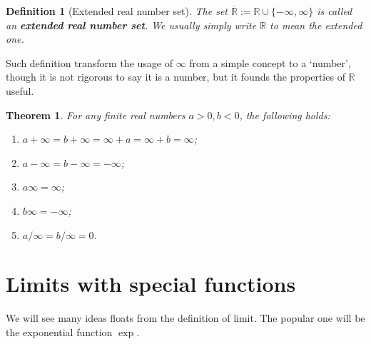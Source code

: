 \documentclass[12pt]{article}
\newtheorem{definition}{Definition}[section]
\newtheorem*{theorem}{Theorem}
\begin{document}
    \begin{definition}[Extended real number set]
        The set $\overline{\mathbb{R}}:=\mathbb{R}\cup\{-\infty,\infty\}$ is called an \textbf{extended real number set}. We usually simply write $\mathbb{R}$ to mean the extended one.
    \end{definition}

    Such definition transform the usage of $\infty$ from a simple concept to a `number', though it is not rigorous to say it is a number, but it founds the properties of $\mathbb{R}$ useful.

    \begin{theorem}
        For any finite real numbers $a>0,b<0$, the following holds:\begin{enumerate}
            \item $a+\infty=b+\infty=\infty+a=\infty+b=\infty$;
            \item $a-\infty=b-\infty=-\infty$;
            \item $a\infty=\infty$;
            \item $b\infty=-\infty$;
            \item $a/\infty=b/\infty=0$.
        \end{enumerate}
    \end{theorem}
    \section{Limits with special functions}

    We will see many ideas floats from the definition of limit. The popular one will be the exponential function $\exp$.
\end{document}
